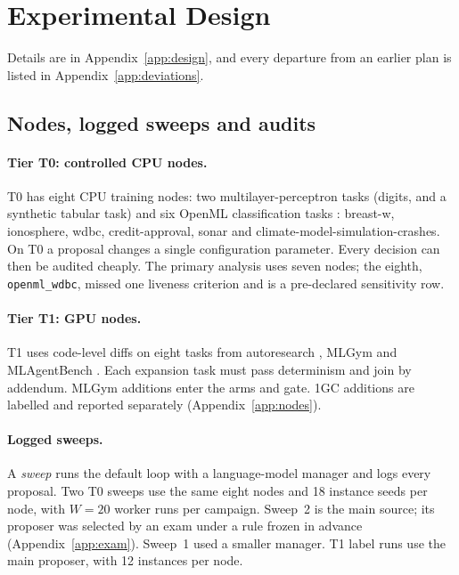 \section{Experimental Design}
\label{sec:setup}

Details are in Appendix~\ref{app:design}, and every departure from an earlier plan is listed in Appendix~\ref{app:deviations}.

\subsection{Nodes, logged sweeps and audits}
\label{sec:setup-data}

\paragraph{Tier T0: controlled CPU nodes.}
T0 has eight CPU training nodes: two multilayer-perceptron tasks (digits, and a synthetic tabular task) and six OpenML classification tasks \citep{vanschoren2013openml}: breast-w, ionosphere, wdbc, credit-approval, sonar and climate-model-simulation-crashes. On T0 a proposal changes a single configuration parameter. Every decision can then be audited cheaply. The primary analysis uses seven nodes; the eighth, \texttt{openml\_wdbc}, missed one liveness criterion and is a pre-declared sensitivity row.

\paragraph{Tier T1: GPU nodes.}
T1 uses code-level diffs on eight tasks from autoresearch \citep{autoresearchloop}, MLGym \citep{mlgym2025} and MLAgentBench \citep{mlagentbench}. Each expansion task must pass determinism and join by addendum. MLGym additions enter the arms and gate. 1GC additions are labelled and reported separately (Appendix~\ref{app:nodes}).

\paragraph{Logged sweeps.}
A \emph{sweep} runs the default loop with a language-model manager and logs every proposal. Two T0 sweeps use the same eight nodes and 18 instance seeds per node, with $W=20$ worker runs per campaign. Sweep~2 is the main source; its proposer was selected by an exam under a rule frozen in advance (Appendix~\ref{app:exam}). Sweep~1 used a smaller manager. T1 label runs use the main proposer, with 12 instances per node.

